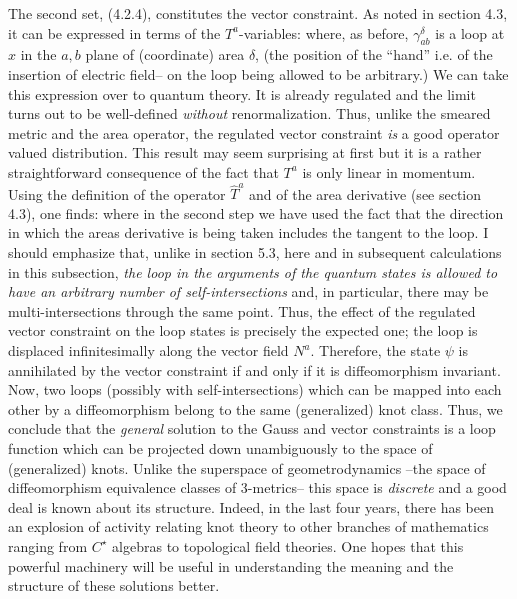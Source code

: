 The second set, (4.2.4), constitutes the vector constraint. As noted in
section 4.3, it can be expressed in terms of the $T^a$-variables:
where, as before, $\gamma^\delta_{ab}$ is a loop at $x$ in the $a,b$ plane of
(coordinate) area $\delta$, (the position of the ``hand'' i.e. of the
insertion of electric field-- on the loop being allowed to be arbitrary.)
We can take this expression over to quantum theory. It is already regulated
and the limit turns out to be well-defined {\it without} renormalization.
Thus, unlike the smeared metric and the area operator, the regulated vector
constraint {\it is} a good operator valued distribution. This result may seem
surprising at first but it is a rather straightforward consequence of the
fact that $T^a$ is only linear in momentum. Using the definition of the
operator $\hat{T}^a$ and of the area derivative (see section 4.3), one finds:
where in the second step we have used the fact that the direction in which
the areas derivative is being taken includes the tangent to the loop. I should
emphasize that, unlike in section 5.3, here and in subsequent calculations
in this subsection, {\it the loop in the arguments of the quantum states is
allowed to have an arbitrary number of self-intersections} and, in particular,
there may be multi-intersections through the same point. Thus, the effect of
the regulated vector constraint on the loop states is precisely the expected
one; the loop is displaced infinitesimally along the vector field $N^a$.
Therefore, the state $\psi$ is annihilated by the vector constraint if and
only if it is diffeomorphism invariant. Now, two loops (possibly with
self-intersections) which can be mapped into each other by a diffeomorphism
belong to the same (generalized) knot class. Thus, we conclude that the {\it
general} solution to the Gauss and vector constraints is a loop function
which can be projected down unambiguously to the space of (generalized) knots.
Unlike the superspace of geometrodynamics --the space of diffeomorphism
equivalence classes of 3-metrics-- this space is {\it discrete} and a good
deal is known about its structure. Indeed, in the last four years, there has
been an explosion of activity relating knot theory to other branches of
mathematics ranging from $C^\star$ algebras to topological field theories.
One hopes that this powerful machinery will be useful in understanding the
meaning and the structure of these solutions better.

